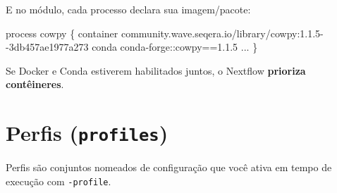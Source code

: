 \documentclass[
  brazilian,
  letterpaper,
  DIV=11,
  numbers=noendperiod]{scrreprt}
\newenvironment{Shaded}{\begin{snugshade}}{\end{snugshade}}
\newcommand{\NormalTok}[1]{\textcolor[rgb]{0.00,0.23,0.31}{#1}}
\newcommand{\OperatorTok}[1]{\textcolor[rgb]{0.37,0.37,0.37}{#1}}
\newcommand{\StringTok}[1]{\textcolor[rgb]{0.13,0.47,0.30}{#1}}
\begin{document}
E no módulo, cada processo declara sua imagem/pacote:

\begin{Shaded}
\begin{Highlighting}[]
\NormalTok{process cowpy }\OperatorTok{\{}
\NormalTok{    container }\StringTok{\textquotesingle{}community.wave.seqera.io/library/cowpy:1.1.5{-}{-}3db457ae1977a273\textquotesingle{}}
\NormalTok{    conda     }\StringTok{\textquotesingle{}conda{-}forge::cowpy==1.1.5\textquotesingle{}}
    \OperatorTok{...}
\OperatorTok{\}}
\end{Highlighting}
\end{Shaded}

\begin{tcolorbox}[enhanced jigsaw, arc=.35mm, bottomrule=.15mm, bottomtitle=1mm, breakable, colback=white, colbacktitle=quarto-callout-tip-color!10!white, colframe=quarto-callout-tip-color-frame, coltitle=black, left=2mm, leftrule=.75mm, opacityback=0, opacitybacktitle=0.6, rightrule=.15mm, title=\textcolor{quarto-callout-tip-color}{\faLightbulb}\hspace{0.5em}{Dica}, titlerule=0mm, toprule=.15mm, toptitle=1mm]

Se Docker e Conda estiverem habilitados juntos, o Nextflow
\textbf{prioriza contêineres}.

\end{tcolorbox}

\section{\texorpdfstring{Perfis
(\texttt{profiles})}{Perfis (profiles)}}\label{perfis-profiles}

Perfis são conjuntos nomeados de configuração que você ativa em tempo de
execução com \texttt{-profile}.
\end{document}
